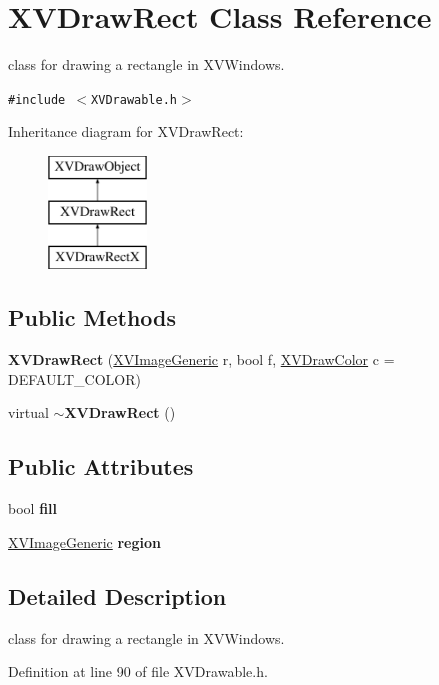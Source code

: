 \hypertarget{class_XVDrawRect}{
\section{XVDraw\-Rect  Class Reference}
\label{XVDrawRect}
}
class for drawing a rectangle in XVWindows. 


{\tt \#include $<$XVDrawable.h$>$}

Inheritance diagram for XVDraw\-Rect:\begin{figure}[H]
\begin{center}
\leavevmode
\includegraphics[height=3cm]{class_XVDrawRect}
\end{center}
\end{figure}
\subsection*{Public Methods}
\begin{CompactItemize}
\item 
{\bf XVDraw\-Rect} (\hyperlink{class_XVImageGeneric}{XVImage\-Generic} r, bool f, \hyperlink{class_XVDrawColor}{XVDraw\-Color} c = DEFAULT\_\-COLOR)
\item 
virtual {\bf $\sim$XVDraw\-Rect} ()
\end{CompactItemize}
\subsection*{Public Attributes}
\begin{CompactItemize}
\item 
bool {\bf fill}
\item 
\hyperlink{class_XVImageGeneric}{XVImage\-Generic} {\bf region}
\end{CompactItemize}


\subsection{Detailed Description}
class for drawing a rectangle in XVWindows.





Definition at line 90 of file XVDrawable.h.

